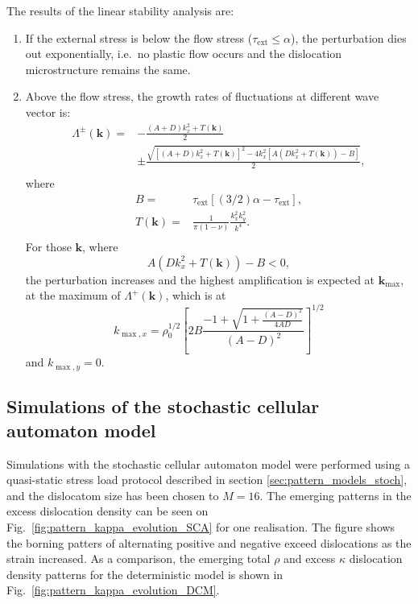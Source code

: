 The results of the linear stability analysis are:
\begin{enumerate}
\item If the external stress is below the flow stress (${\tau _{{\text{ext}}}} \leqslant \alpha $), the perturbation dies out exponentially, i.e.\ no plastic flow occurs and the dislocation microstructure remains the same.
\item Above the flow stress, the growth rates of fluctuations at different wave vector is:
\[\begin{aligned}
  {\Lambda ^ \pm }\left( {\mathbf{k}} \right) =  &  - \frac{{\left( {A + D} \right)k_x^2 + T\left( {\mathbf{k}} \right)}}{2} \\ 
   &  \pm \frac{{\sqrt {{{\left[ {\left( {A + D} \right)k_x^2 + T\left( {\mathbf{k}} \right)} \right]}^2} - 4k_x^2\left[ {A\left( {Dk_x^2 + T\left( {\mathbf{k}} \right)} \right) - B} \right]} }}{2}, \\ 
\end{aligned} \]
where 
\[\begin{aligned}
  B =  & {\tau _{{\text{ext}}}}\left[ {\left( {3/2} \right)\alpha  - {\tau _{{\text{ext}}}}} \right], \\ 
  T\left( {\mathbf{k}} \right) =  & \frac{1}{{\pi \left( {1 - \nu } \right)}}\frac{{k_x^2k_y^2}}{{{k^4}}}. \\ 
\end{aligned} \]
For those ${\mathbf{k}}$, where
\[A\left( {Dk_x^2 + T\left( {\mathbf{k}} \right)} \right) - B < 0,\]
the perturbation increases and the highest amplification is expected at ${{\mathbf{k}}_{\max }}$, at the maximum of ${\Lambda ^ + }\left( {\mathbf{k}} \right)$, which is at
\begin{equation} \label{eq:pattern_kmax}
{k_{\max ,x}} = \rho _0^{1/2}{\left[ {2B\frac{{ - 1 + \sqrt {1 + \frac{{{{\left( {A - D} \right)}^2}}}{{4AD}}} }}{{{{\left( {A - D} \right)}^2}}}} \right]^{1/2}}
\end{equation}
and $k_{\max ,y} = 0$.
\end{enumerate}

\subsection[Simulations of the stochastic model]{Simulations of the stochastic cellular automaton model}

Simulations with the stochastic cellular automaton model were performed using a quasi-static stress load protocol described in section \ref{sec:pattern_models_stoch}, and the dislocatom size has been chosen to $M=16$. The emerging patterns in the excess dislocation density can be seen on Fig.~\ref{fig:pattern_kappa_evolution_SCA} for one realisation. The figure shows the borning patters of alternating positive and negative exceed dislocations as the strain increased. As a comparison, the emerging total $\rho$ and excess $\kappa$ dislocation density patterns for the deterministic model is shown in Fig.~\ref{fig:pattern_kappa_evolution_DCM}.

